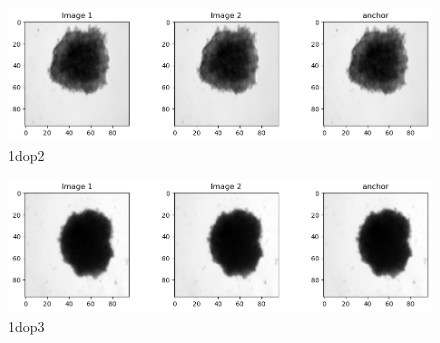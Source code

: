 \documentclass[a4paper,12pt]{report}
\begin{document}
\begin{figure}[H]
  \centering
  \includegraphics[width=0.9\linewidth]{figures/1dop2.png} %
  \caption{1dop2}
  \label{fig:1doutput2}
\end{figure}

\begin{figure}[H]
  \centering
  \includegraphics[width=0.9\linewidth]{figures/1dop3.png} %
  \caption{1dop3}
  \label{fig:1doutput3}
\end{figure}
\end{document}
